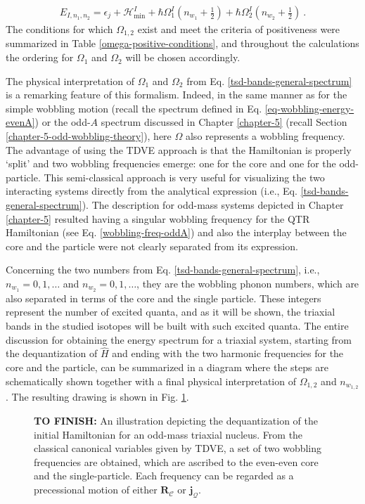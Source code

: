 \begin{align}
    E_{I,n_1,n_2}=\epsilon_j+\mathcal{H}_\text{min}^I+\hbar\Omega_1^I\left(n_{w_1}+\frac{1}{2}\right)+\hbar\Omega_2^I\left(n_{w_2}+\frac{1}{2}\right)\ .
    \label{tsd-bands-general-spectrum}
\end{align}
The conditions for which $\Omega_{1,2}$ exist and meet the criteria of positiveness were summarized in Table \ref{omega-positive-conditions}, and throughout the calculations the ordering for $\Omega_1$ and $\Omega_2$ will be chosen accordingly.

The physical interpretation of $\Omega_1$ and $\Omega_2$ from Eq. \ref{tsd-bands-general-spectrum} is a remarking feature of this formalism. Indeed, in the same manner as for the simple wobbling motion (recall the spectrum defined in Eq. \ref{eq-wobbling-energy-evenA}) or the odd-$A$ spectrum discussed in Chapter \ref{chapter-5} (recall Section \ref{chapter-5-odd-wobbling-theory}), here $\Omega$ also represents a wobbling frequency. The advantage of using the TDVE approach is that the Hamiltonian is properly `split' and two wobbling frequencies emerge: one for the core and one for the odd-particle. This semi-classical approach is very useful for visualizing the two interacting systems directly from the analytical expression (i.e., Eq. \ref{tsd-bands-general-spectrum}). The description for odd-mass systems depicted in Chapter \ref{chapter-5} resulted having a singular wobbling frequency for the QTR Hamiltonian (see Eq. \ref{wobbling-freq-oddA}) and also the interplay between the core and the particle were not clearly separated from its expression.

Concerning the two numbers from Eq. \ref{tsd-bands-general-spectrum}, i.e., $n_{w_1}=0,1,\dots$ and $n_{w_2}=0,1,\dots$, they are the wobbling phonon numbers, which are also separated in terms of the core and the single particle. These integers represent the number of excited quanta, and as it will be shown, the triaxial bands in the studied isotopes will be built with such excited quanta. The entire discussion for obtaining the energy spectrum for a triaxial system, starting from the dequantization of $\hat{H}$ and ending with the two harmonic frequencies for the core and the particle, can be summarized in a diagram where the steps are schematically shown together with a final physical interpretation of $\Omega_{1,2}$ and $n_{w_{1,2}}$. The resulting drawing is shown in Fig. \ref{TDVE-wobbling-complete-sketch}.
\begin{figure}
    \centering
    \caption{\textbf{TO FINISH: }An illustration depicting the dequantization of the initial Hamiltonian for an odd-mass triaxial nucleus. From the classical canonical variables given by TDVE, a set of two wobbling frequencies are obtained, which are ascribed to the even-even core and the single-particle. Each frequency can be regarded as a precessional motion of either $\mathbf{R}_\mathscr{C}$ or $\mathbf{j}_\mathcal{Q}$.}
    \label{TDVE-wobbling-complete-sketch}
\end{figure}

